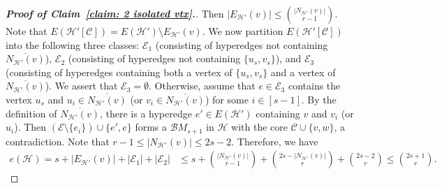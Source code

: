 \documentclass[10pt,a4paper]{amsart}
\newcommand\cB{{\mathcal B}}
\newcommand\cC{{\mathcal C}}
\newcommand\cE{{\mathcal E}}
\newcommand\cH{{\mathcal H}}
\begin{document}
\begin{proof}[{\bf{Proof of Claim~\ref{claim: 2 isolated vtx}.}}]
    Then $|E_{\cH'}(v)|\leq \binom{|N_{\cH'}(v)|}{r-1}$.
    Note that $E(\cH'[\cC])=E(\cH')\setminus E_{\cH'}(v)$.
    We now partition $E(\cH'[\cC])$ into the following three classes:
    $\cE_1$ (consisting of hyperedges not containing $\overline{N_{\cH'}(v)}$),
    $\cE_2$ (consisting of hyperedges not containing $\{u_s,v_s\}$),
    and $\cE_3$ (consisting of hyperedges containing both a vertex of $\{u_s,v_s\}$ and a vertex of $\overline{N_{\cH'}(v)}$).
    We assert that $\cE_3=\emptyset$. Otherwise, assume that $e\in \cE_3$ contains the vertex $u_s$ and $u_i\in \overline{N_{\cH'}(v)}$ (or $v_i\in \overline{N_{\cH'}(v)}$) for some $i\in [s-1]$.
    By the definition of $\overline{N_{\cH'}(v)}$, there is a hyperedge $e'\in E(\cH')$ containing $v$ and $v_i$ (or $u_i$). Then $(\cE\setminus \{e_i\})\cup \{e',e\}$ forms a $\cB M_{s+1}$ in $\cH$ with the core $\cC\cup \{v,w\}$, a contradiction.
    Note that $r-1\leq|N_{\cH'}(v)|\leq 2s-2$. Therefore, we have
     \begin{equation*}
    \begin{aligned}
        e(\cH)= s+|E_{\cH'}(v)|+|\cE_1|+|\cE_2| &\leq s + \binom{|N_{\cH'}(v)|}{r-1} + \binom{2s-|N_{{\cH'}}(v)|}{r} + \binom{2s-2}{r}
        \le \binom{2s+1}{r}.
    \end{aligned}
     \end{equation*}
     \end{proof}
\end{document}
